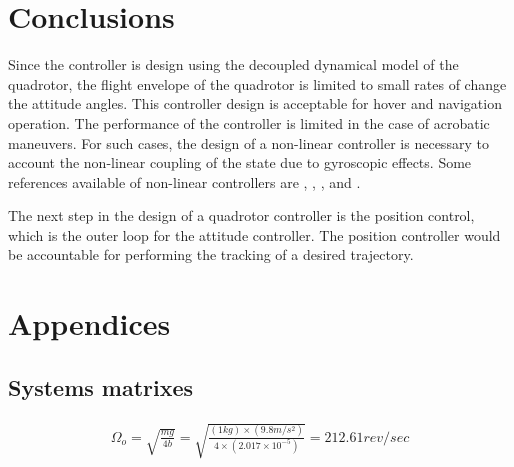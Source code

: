 \documentclass[12pt]{article}
\begin{document}
\section{Conclusions}
Since the controller is design using the decoupled dynamical model of the quadrotor, the flight envelope of the quadrotor is limited to small rates of change the attitude angles. This controller design is acceptable for hover and navigation operation. The performance of the controller is limited in the case of acrobatic maneuvers. For such cases, the design of a non-linear controller is necessary to account the non-linear coupling of the state due to gyroscopic effects. Some references available of non-linear controllers are \cite{Boua05}, \cite{Cabe14}, \cite{Raff10}, and \cite{Wang14}.

The next step in the design of a quadrotor controller is the position control, which is the outer loop for the attitude controller. The position controller would be accountable for performing the tracking of a desired trajectory.

\appendix
\section*{Appendices}
\renewcommand{\thesubsection}{\Alph{subsection}}

\subsection{Systems matrixes}

\label{sec:linearized-equations}

\begin{equation}
  \begin{split}
    \Omega_o = \sqrt{\frac{mg}{4b}} = \sqrt{\frac{\left( 1 kg \right) \times \left( 9.8m/s^2 \right)}{4 \times \left (2.017\times 10^{-5} \right )}} = 212.61 rev/sec
  \end{split}
\end{equation}
\end{document}
